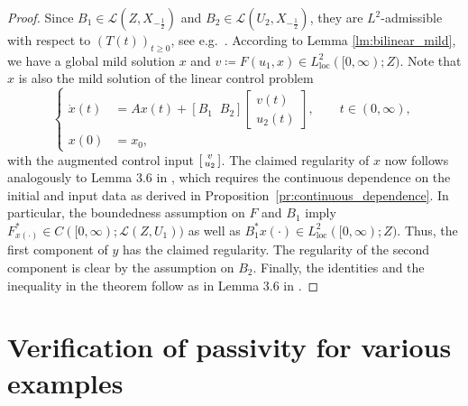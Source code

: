 \documentclass{cocv}
\DeclareMathOperator{\loc}{loc}
\theoremstyle{definition}
\newenvironment{smallbmatrix}%
{\left[\begin{smallmatrix}}%
{\end{smallmatrix}\right]}%
\begin{document}
\begin{proof}
    Since $B_1 \in \mathcal{L}(Z,X_{-\frac{1}{2}})$ and $B_2 \in \mathcal{L}(U_2,X_{-\frac{1}{2}})$, they are $L^2$-admissible with respect to $(T(t))_{t\ge0}$, see e.g.~\cite[Prop.~6.5]{MR3230878}. According to Lemma \ref{lm:bilinear_mild}, we have a global mild solution $x$ and $v \coloneqq F(u_1,x) \in L^2_{\loc}([0, \infty); Z)$. Note that $x$ is also the mild solution of the linear control problem
    \begin{equation*}
        \left\{\begin{aligned}
        \dot x(t) &= Ax(t) + [B_1 \;\; B_2] \begin{bmatrix}
            v(t) \\ u_2(t)
        \end{bmatrix}, \qquad t\in (0, \infty),\\
        x(0) &= x_0,
        \end{aligned}\right.
    \end{equation*}
    with the augmented control input $\begin{smallbmatrix}
        v\\ u_2
    \end{smallbmatrix}$.    
    The claimed regularity of $x$ now follows analogously to Lemma 3.6 in \cite{hosfeld2024input}, which requires the continuous dependence on the initial and input data as derived in Proposition~\ref{pr:continuous_dependence}. In particular, the boundedness assumption on $F$ and $B_1$ imply $F_{x(\cdot)}^* \in C([0,\infty);\mathcal{L}(Z,U_1))$ as well as $B_1^*x(\cdot) \in L^2_{\loc}([0,\infty);Z)$. Thus, the first component of $y$ has the claimed regularity. The regularity of the second component is clear by the assumption on $B_2$.
    Finally, the identities and the inequality in the theorem follow as in Lemma 3.6 in \cite{hosfeld2024input}.
\end{proof}

\section{Verification of passivity for various examples}
\label{sec:applications}
\end{document}
